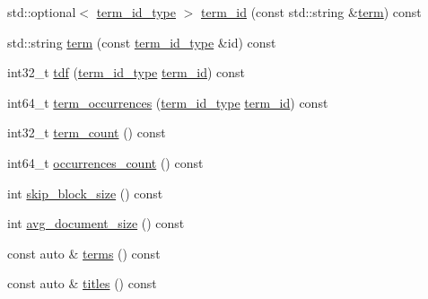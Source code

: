 \begin{DoxyCompactItemize}
\item 
std\+::optional$<$ \mbox{\hyperlink{classirk_1_1basic__inverted__index__view_a6b272abc76df208ce59bac93810e7331}{term\+\_\+id\+\_\+type}} $>$ \mbox{\hyperlink{classirk_1_1basic__inverted__index__view_aa7d7b49b3657d589020b4325162f55bf}{term\+\_\+id}} (const std\+::string \&\mbox{\hyperlink{classirk_1_1basic__inverted__index__view_a9d148686eeca4dc1f9fd1530834ef8f6}{term}}) const
\item 
std\+::string \mbox{\hyperlink{classirk_1_1basic__inverted__index__view_a9d148686eeca4dc1f9fd1530834ef8f6}{term}} (const \mbox{\hyperlink{classirk_1_1basic__inverted__index__view_a6b272abc76df208ce59bac93810e7331}{term\+\_\+id\+\_\+type}} \&id) const
\item 
int32\+\_\+t \mbox{\hyperlink{classirk_1_1basic__inverted__index__view_ad0616dba820e013107e4cad02d13d73f}{tdf}} (\mbox{\hyperlink{classirk_1_1basic__inverted__index__view_a6b272abc76df208ce59bac93810e7331}{term\+\_\+id\+\_\+type}} \mbox{\hyperlink{classirk_1_1basic__inverted__index__view_aa7d7b49b3657d589020b4325162f55bf}{term\+\_\+id}}) const
\item 
int64\+\_\+t \mbox{\hyperlink{classirk_1_1basic__inverted__index__view_ad87994cfa2fd03569e9154966b81a505}{term\+\_\+occurrences}} (\mbox{\hyperlink{classirk_1_1basic__inverted__index__view_a6b272abc76df208ce59bac93810e7331}{term\+\_\+id\+\_\+type}} \mbox{\hyperlink{classirk_1_1basic__inverted__index__view_aa7d7b49b3657d589020b4325162f55bf}{term\+\_\+id}}) const
\item 
int32\+\_\+t \mbox{\hyperlink{classirk_1_1basic__inverted__index__view_aef452bf73078178f01cc87db85d8886d}{term\+\_\+count}} () const
\item 
int64\+\_\+t \mbox{\hyperlink{classirk_1_1basic__inverted__index__view_a7a5dbe03c2b4aac509e3567a97ba2aa4}{occurrences\+\_\+count}} () const
\item 
int \mbox{\hyperlink{classirk_1_1basic__inverted__index__view_a9d250a6240d62fcb5fa8c2287c6b9194}{skip\+\_\+block\+\_\+size}} () const
\item 
int \mbox{\hyperlink{classirk_1_1basic__inverted__index__view_a2882c94b94350de22c6e58ada56ed523}{avg\+\_\+document\+\_\+size}} () const
\item 
const auto \& \mbox{\hyperlink{classirk_1_1basic__inverted__index__view_ad1d0983d65f8001c3ced2c4cd424eca3}{terms}} () const
\item 
const auto \& \mbox{\hyperlink{classirk_1_1basic__inverted__index__view_ad5ad5baee856f92041abac627c4f494d}{titles}} () const

\end{DoxyCompactItemize}
